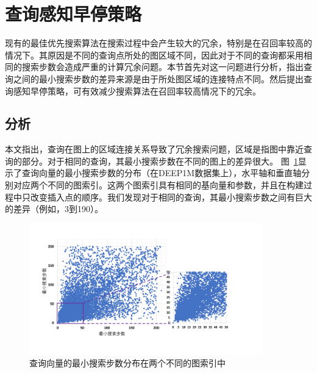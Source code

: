 \section{查询感知早停策略}\label{sec:galg-earlystop}
现有的最佳优先搜索算法在搜索过程中会产生较大的冗余，特别是在召回率较高的情况下。其原因是不同的查询点所处的图区域不同，因此对于不同的查询都采用相同的搜索步数会造成严重的计算冗余问题。本节首先对这一问题进行分析，指出查询之间的最小搜索步数的差异来源是由于所处图区域的连接特点不同。然后提出查询感知早停策略，可有效减少搜索算法在召回率较高情况下的冗余。

\subsection{分析}
本文指出，查询在图上的区域连接关系导致了冗余搜索问题，区域是指图中靠近查询的部分。对于相同的查询，其最小搜索步数在不同的图上的差异很大。
图~\ref{fig:min-step}显示了查询向量的最小搜索步数的分布（在DEEP1M数据集上），水平轴和垂直轴分别对应两个不同的图索引。这两个图索引具有相同的基向量和参数，并且在构建过程中只改变插入点的顺序。我们发现对于相同的查询，其最小搜索步数之间有巨大的差异（例如，3到190）。
\begin{figure}[htbp]
  \centering
  \includegraphics[width=0.9\textwidth]{figures/context-1/min search step.pdf}
  \caption{查询向量的最小搜索步数分布在两个不同的图索引中}
  \label{fig:min-step}
\end{figure}


